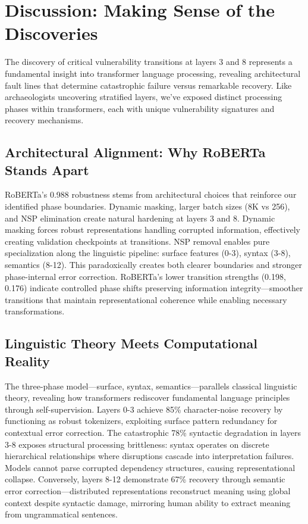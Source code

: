 \section{Discussion: Making Sense of the Discoveries}

The discovery of critical vulnerability transitions at layers 3 and 8 represents a fundamental insight into transformer language processing, revealing architectural fault lines that determine catastrophic failure versus remarkable recovery. Like archaeologists uncovering stratified layers, we've exposed distinct processing phases within transformers, each with unique vulnerability signatures and recovery mechanisms.

\subsection{Architectural Alignment: Why RoBERTa Stands Apart}

RoBERTa's 0.988 robustness stems from architectural choices that reinforce our identified phase boundaries. Dynamic masking, larger batch sizes (8K vs 256), and NSP elimination create natural hardening at layers 3 and 8. Dynamic masking forces robust representations handling corrupted information, effectively creating validation checkpoints at transitions. NSP removal enables pure specialization along the linguistic pipeline: surface features (0-3), syntax (3-8), semantics (8-12). This paradoxically creates both clearer boundaries and stronger phase-internal error correction. RoBERTa's lower transition strengths (0.198, 0.176) indicate controlled phase shifts preserving information integrity---smoother transitions that maintain representational coherence while enabling necessary transformations.

\subsection{Linguistic Theory Meets Computational Reality}

The three-phase model---surface, syntax, semantics---parallels classical linguistic theory, revealing how transformers rediscover fundamental language principles through self-supervision. Layers 0-3 achieve 85\% character-noise recovery by functioning as robust tokenizers, exploiting surface pattern redundancy for contextual error correction. The catastrophic 78\% syntactic degradation in layers 3-8 exposes structural processing brittleness: syntax operates on discrete hierarchical relationships where disruptions cascade into interpretation failures. Models cannot parse corrupted dependency structures, causing representational collapse. Conversely, layers 8-12 demonstrate 67\% recovery through semantic error correction---distributed representations reconstruct meaning using global context despite syntactic damage, mirroring human ability to extract meaning from ungrammatical sentences.

